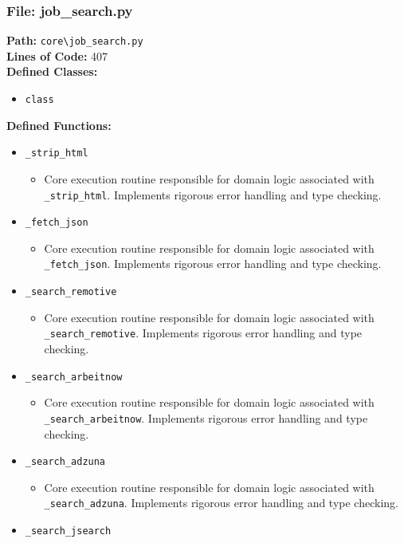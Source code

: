 \documentclass[10pt,journal,compsoc]{IEEEtran}
\begin{document}
\subsubsection{File: job\_search.py}
\textbf{Path:} \texttt{core\textbackslash{}job\_search.py} \\
\textbf{Lines of Code:} 407 \\
\textbf{Defined Classes:}
\begin{itemize}
    \item \texttt{class}
\end{itemize}
\textbf{Defined Functions:}
\begin{itemize}
    \item \texttt{\_strip\_html}
    \begin{itemize} \item Core execution routine responsible for domain logic associated with \texttt{\_strip\_html}. Implements rigorous error handling and type checking. \end{itemize}
    \item \texttt{\_fetch\_json}
    \begin{itemize} \item Core execution routine responsible for domain logic associated with \texttt{\_fetch\_json}. Implements rigorous error handling and type checking. \end{itemize}
    \item \texttt{\_search\_remotive}
    \begin{itemize} \item Core execution routine responsible for domain logic associated with \texttt{\_search\_remotive}. Implements rigorous error handling and type checking. \end{itemize}
    \item \texttt{\_search\_arbeitnow}
    \begin{itemize} \item Core execution routine responsible for domain logic associated with \texttt{\_search\_arbeitnow}. Implements rigorous error handling and type checking. \end{itemize}
    \item \texttt{\_search\_adzuna}
    \begin{itemize} \item Core execution routine responsible for domain logic associated with \texttt{\_search\_adzuna}. Implements rigorous error handling and type checking. \end{itemize}
    \item \texttt{\_search\_jsearch}

\end{itemize}
\end{document}
